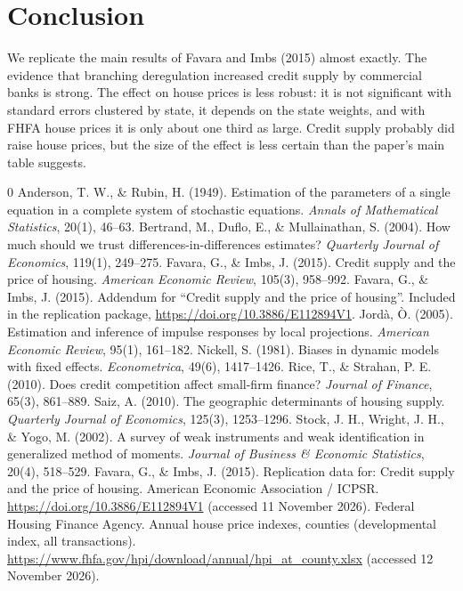 \documentclass[12pt,a4paper]{article}
\begin{document}
\section{Conclusion}

We replicate the main results of Favara and Imbs (2015) almost exactly. The evidence that branching deregulation increased credit supply by commercial banks is strong. The effect on house prices is less robust: it is not significant with standard errors clustered by state, it depends on the state weights, and with FHFA house prices it is only about one third as large. Credit supply probably did raise house prices, but the size of the effect is less certain than the paper's main table suggests.

\begin{thebibliography}{0}
 Anderson, T. W., \& Rubin, H. (1949). Estimation of the parameters of a single equation in a complete system of stochastic equations. \textit{Annals of Mathematical Statistics}, 20(1), 46--63.
 Bertrand, M., Duflo, E., \& Mullainathan, S. (2004). How much should we trust differences-in-differences estimates? \textit{Quarterly Journal of Economics}, 119(1), 249--275.
 Favara, G., \& Imbs, J. (2015). Credit supply and the price of housing. \textit{American Economic Review}, 105(3), 958--992.
 Favara, G., \& Imbs, J. (2015). Addendum for ``Credit supply and the price of housing''. Included in the replication package, \url{https://doi.org/10.3886/E112894V1}.
 Jord\`a, \`O. (2005). Estimation and inference of impulse responses by local projections. \textit{American Economic Review}, 95(1), 161--182.
 Nickell, S. (1981). Biases in dynamic models with fixed effects. \textit{Econometrica}, 49(6), 1417--1426.
 Rice, T., \& Strahan, P. E. (2010). Does credit competition affect small-firm finance? \textit{Journal of Finance}, 65(3), 861--889.
 Saiz, A. (2010). The geographic determinants of housing supply. \textit{Quarterly Journal of Economics}, 125(3), 1253--1296.
 Stock, J. H., Wright, J. H., \& Yogo, M. (2002). A survey of weak instruments and weak identification in generalized method of moments. \textit{Journal of Business \& Economic Statistics}, 20(4), 518--529.
 Favara, G., \& Imbs, J. (2015). Replication data for: Credit supply and the price of housing. American Economic Association / ICPSR. \url{https://doi.org/10.3886/E112894V1} (accessed 11 November 2026).
 Federal Housing Finance Agency. Annual house price indexes, counties (developmental index, all transactions). \url{https://www.fhfa.gov/hpi/download/annual/hpi_at_county.xlsx} (accessed 12 November 2026).
\end{thebibliography}
\end{document}
